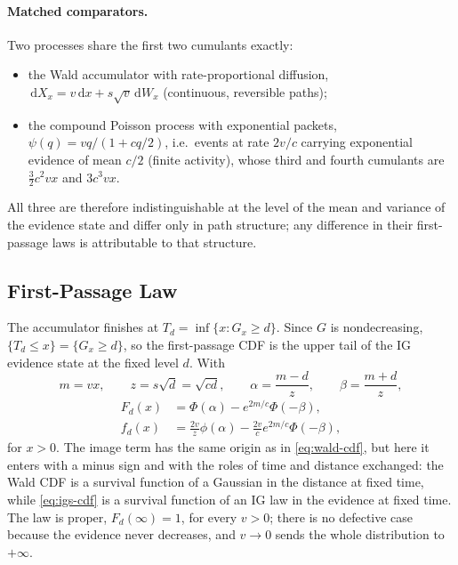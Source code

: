 \documentclass[12pt]{article}
\newcommand{\dd}{\,\mathrm{d}}
\newcommand{\PhiN}{\Phi}
\newcommand{\phiN}{\phi}
\begin{document}
\paragraph{Matched comparators.}
Two processes share the first two cumulants exactly:
\begin{itemize}
  \item the Wald accumulator with rate-proportional diffusion, $\dd X_x=v\dd x+s\sqrt v\dd W_x$ (continuous, reversible paths);
  \item the compound Poisson process with exponential packets, $\psi(q)=vq/(1+cq/2)$, i.e.\ events at rate $2v/c$ carrying exponential evidence of mean $c/2$ (finite activity), whose third and fourth cumulants are $\tfrac32c^2vx$ and $3c^3vx$.
\end{itemize}
All three are therefore indistinguishable at the level of the mean and variance of the evidence state and differ only in path structure; any difference in their first-passage laws is attributable to that structure.

\subsection{First-Passage Law}
The accumulator finishes at $T_d=\inf\{x:G_x\ge d\}$. Since $G$ is nondecreasing, $\{T_d\le x\}=\{G_x\ge d\}$, so the first-passage CDF is the upper tail of the IG evidence state at the fixed level $d$. With
\begin{equation}
  m=vx,\qquad z=s\sqrt d=\sqrt{cd},\qquad
  \alpha=\frac{m-d}{z},\qquad \beta=\frac{m+d}{z},
\end{equation}
\begin{align}
  F_d(x)&=\PhiN(\alpha)-e^{2m/c}\PhiN(-\beta),\label{eq:igs-cdf}\\
  f_d(x)&=\frac{2v}{z}\phiN(\alpha)-\frac{2v}{c}e^{2m/c}\PhiN(-\beta),
  \label{eq:igs-pdf}
\end{align}
for $x>0$. The image term has the same origin as in \eqref{eq:wald-cdf}, but here it enters with a minus sign and with the roles of time and distance exchanged: the Wald CDF is a survival function of a Gaussian in the distance at fixed time, while \eqref{eq:igs-cdf} is a survival function of an IG law in the evidence at fixed time. The law is proper, $F_d(\infty)=1$, for every $v>0$; there is no defective case because the evidence never decreases, and $v\to0$ sends the whole distribution to $+\infty$.
\end{document}
